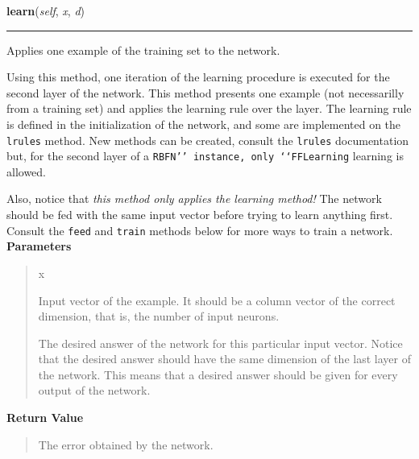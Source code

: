 \hspace{.8\funcindent}\begin{boxedminipage}{\funcwidth}

    \raggedright \textbf{learn}(\textit{self}, \textit{x}, \textit{d})

    \vspace{-1.5ex}

    \rule{\textwidth}{0.5\fboxrule}
\setlength{\parskip}{2ex}

Applies one example of the training set to the network.

Using this method, one iteration of the learning procedure is executed
for the second layer of the network. This method presents one example
(not necessarilly from a training set) and applies the learning rule
over the layer. The learning rule is defined in the initialization of
the network, and some are implemented on the \texttt{lrules} method. New
methods can be created, consult the \texttt{lrules} documentation but, for
the second layer of a \texttt{RBFN'{}' instance, only `{}`FFLearning} learning is
allowed.

Also, notice that \emph{this method only applies the learning method!} The
network should be fed with the same input vector before trying to learn
anything first. Consult the \texttt{feed} and \texttt{train} methods below for
more ways to train a network.
\setlength{\parskip}{1ex}
      \textbf{Parameters}
      \vspace{-1ex}

      \begin{quote}
        \begin{Ventry}{x}

          \item[x]


Input vector of the example. It should be a column vector of the
correct dimension, that is, the number of input neurons.
          \item[d]


The desired answer of the network for this particular input vector.
Notice that the desired answer should have the same dimension of the
last layer of the network. This means that a desired answer should
be given for every output of the network.
        \end{Ventry}

      \end{quote}

      \textbf{Return Value}
    \vspace{-1ex}

      \begin{quote}

The error obtained by the network.
      \end{quote}

    \end{boxedminipage}

